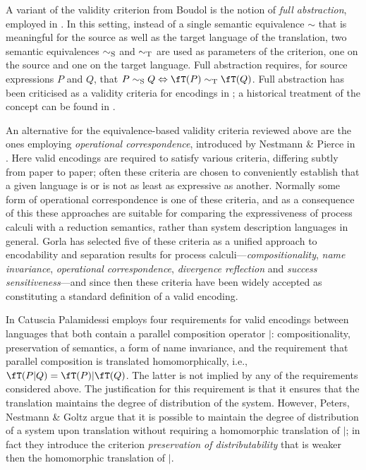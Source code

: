 \documentclass[runningheads]{llncs}
\begin{document}
A variant of the validity criterion from Boudol is the notion of \emph{full abstraction}, employed
in \cite{Rie91,Sha91,Sha92,NestmannP00,Nestmann00,BPV05,Fu16}. In this setting, instead of a single
semantic equivalence $\sim$ that is meaningful for the source as well as the target language of the
translation, two semantic equivalences $\sim_{\rm S}$ and $\sim_{\rm T}$ are used as parameters of
the criterion, one on the source and one on the target language. Full abstraction requires, for
source expressions $P$ and $Q$, that
$P \sim_{\rm S} Q \Leftrightarrow \fT(P) \sim_{\rm T} \fT(Q)$.
Full abstraction has been criticised as a validity criteria for encodings in \cite{BPV08,GN16,Parrow16};
a historical treatment of the concept can be found in \cite[Sect.~18]{vG18e}.

An alternative for the equivalence-based validity criteria reviewed above are the ones employing
\emph{operational correspondence}, introduced by Nestmann \& Pierce in \cite{NestmannP00}.
Here valid encodings are required to satisfy various criteria, differing subtly from paper to
paper; often these criteria are chosen to conveniently establish that a given language is or is not
as least as expressive as another. Normally some form of operational correspondence is one of these
criteria, and as a consequence of this these approaches are suitable for comparing the
expressiveness of process calculi with a reduction semantics, rather than system description
languages in general. Gorla \cite{Gorla10a} has selected five of these criteria as a
unified approach to encodability and separation results for process calculi---\emph{compositionality},
\emph{name invariance}, \emph{operational correspondence}, \emph{divergence reflection} and
\emph{success sensitiveness}---and since then these criteria have been widely accepted as
constituting a standard definition of a valid encoding.
\advance\textheight 1pt

\advance\textheight -1pt
In \cite{Palamidessi03} Catuscia Palamidessi employs four requirements for valid encodings between
languages that both contain a parallel composition operator $|$:
compositionality, preservation of semantics, a form of name invariance, and the requirement that
parallel composition is translated homomorphically, i.e., $\fT(P|Q) = \fT(P) | \fT(Q)$.
The latter is not implied by any of the requirements considered above.
The justification for this requirement is that it ensures that the translation maintains the degree
of distribution of the system. However, Peters, Nestmann \& Goltz \cite{PNG13} argue that it is possible to
maintain the degree of distribution of a system upon translation without requiring a homomorphic
translation of $|$; in fact they introduce the criterion \emph{preservation of distributability}
that is weaker then the homomorphic translation of $|$.
\end{document}
